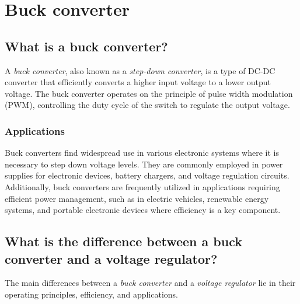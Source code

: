 \section{Buck converter}
\subsection{What is a buck converter?}
A \textit{buck converter}, also known as a \textit{step-down converter}, is a type of DC-DC converter that efficiently converts a higher input voltage to a lower output voltage. The buck converter operates on the principle of pulse width modulation (PWM), controlling the duty cycle of the switch to regulate the output voltage.

\subsubsection{Applications}
Buck converters find widespread use in various electronic systems where it is necessary to step down voltage levels. They are commonly employed in power supplies for electronic devices, battery chargers, and voltage regulation circuits. Additionally, buck converters are frequently utilized in applications requiring efficient power management, such as in electric vehicles, renewable energy systems, and portable electronic devices where efficiency is a key component.

\subsection{What is the difference between a buck converter and a voltage regulator?}
The main differences between a \textit{buck converter} and a \textit{voltage regulator} lie in their operating principles, efficiency, and applications.

